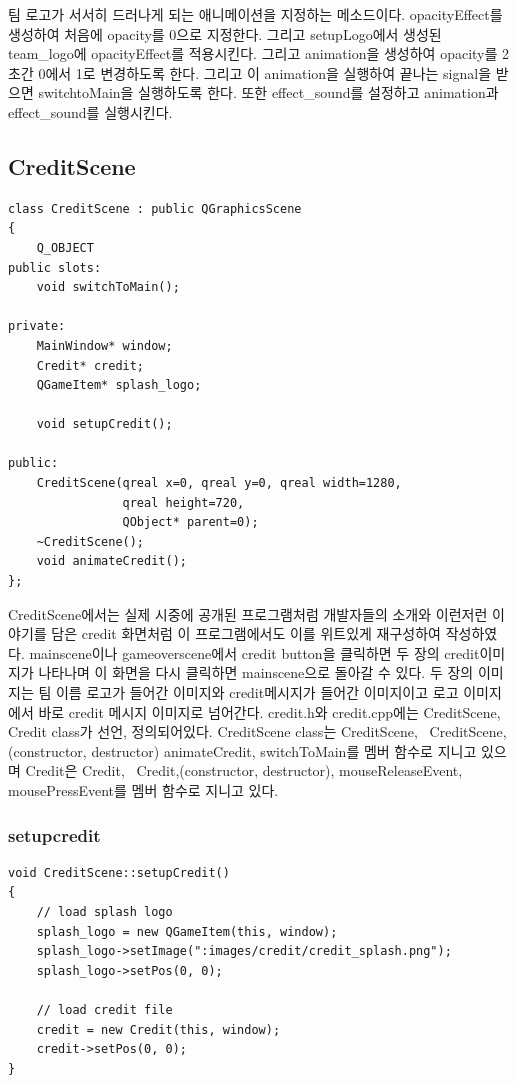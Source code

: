 \documentclass[10pt,oneside,a4paper,titlepage]{article}
\begin{document}
팀 로고가 서서히 드러나게 되는 애니메이션을 지정하는 메소드이다. opacityEffect를 생성하여 처음에 opacity를 0으로 지정한다. 그리고 setupLogo에서 생성된 team\_logo에 opacityEffect를 적용시킨다. 그리고 animation을 생성하여 opacity를 2초간 0에서 1로 변경하도록 한다. 그리고 이 animation을 실행하여 끝나는 signal을 받으면 switchtoMain을 실행하도록 한다. 또한 effect\_sound를 설정하고 animation과 effect\_sound를 실행시킨다.

\subsection{CreditScene}
\begin{lstlisting}
class CreditScene : public QGraphicsScene
{
    Q_OBJECT
public slots:
    void switchToMain();

private:
    MainWindow* window;
    Credit* credit;
    QGameItem* splash_logo;

    void setupCredit();

public:
    CreditScene(qreal x=0, qreal y=0, qreal width=1280,
                qreal height=720,
                QObject* parent=0);
    ~CreditScene();
    void animateCredit();
};
\end{lstlisting}
CreditScene에서는 실제 시중에 공개된 프로그램처럼 개발자들의 소개와 이런저런 이야기를 담은 credit 화면처럼 이 프로그램에서도 이를 위트있게 재구성하여 작성하였다. mainscene이나 gameoverscene에서 credit button을 클릭하면 두 장의 credit이미지가 나타나며 이 화면을 다시 클릭하면 mainscene으로 돌아갈 수 있다. 두 장의 이미지는 팀 이름 로고가 들어간 이미지와 credit메시지가 들어간 이미지이고 로고 이미지에서 바로 credit 메시지 이미지로 넘어간다.
credit.h와 credit.cpp에는 CreditScene, Credit class가 선언, 정의되어있다. CreditScene class는 CreditScene, ~CreditScene, (constructor, destructor) animateCredit, switchToMain를 멤버 함수로 지니고 있으며 Credit은 Credit, ~Credit,(constructor, destructor), mouseReleaseEvent, mousePressEvent를 멤버 함수로 지니고 있다.

\subsubsection{setupcredit}
\begin{lstlisting}[escapeinside=~~]
void CreditScene::setupCredit()
{
    // load splash logo
    splash_logo = new QGameItem(this, window);
    splash_logo->setImage(":images/credit/credit_splash.png");
    splash_logo->setPos(0, 0);

    // load credit file
    credit = new Credit(this, window);
    credit->setPos(0, 0);
}
\end{lstlisting}
\end{document}
